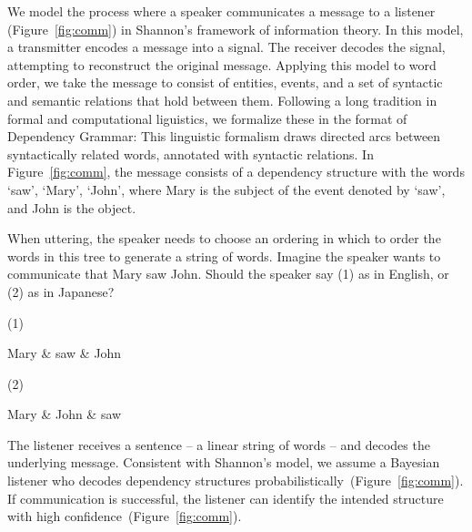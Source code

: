 \documentclass[9pt,twocolumn,twoside,lineno]{pnas-new}
\begin{document}
We model the process where a speaker communicates a message to a listener (Figure~\ref{fig:comm}) in Shannon's framework of information theory.
In this model, a transmitter encodes a message into a signal. The receiver decodes the signal, attempting to reconstruct the original message.
Applying this model to word order, we take the message to consist of entities, events, and a set of syntactic and semantic relations that hold between them.
Following a long tradition in formal and computational liguistics, we formalize these in the format of Dependency Grammar:
This linguistic formalism draws directed arcs between syntactically related words, annotated with syntactic relations.
In Figure~\ref{fig:comm}, the message consists of a dependency structure with the words `saw', `Mary', `John', where Mary is the subject of the event denoted by `saw', and John is the object.


When uttering, the speaker needs to choose an ordering in which to order the words in this tree to generate a string of words.
Imagine the speaker wants to communicate that Mary saw John.
Should the speaker say (1) as in English, or (2) as in Japanese?

(1)
\begin{dependency}[theme=simple]
    \begin{deptext}
    Mary \& saw \& John \\
    \end{deptext}
\end{dependency}
(2)
\begin{dependency}[theme=simple]
    \begin{deptext}
    Mary \& John  \& saw \\
    \end{deptext}
\end{dependency}

The listener receives a sentence -- a linear string of words -- and decodes the underlying message.
Consistent with Shannon's model, we assume a Bayesian listener who decodes dependency structures probabilistically~(Figure~\ref{fig:comm}).
If communication is successful, the listener can identify the intended structure with high confidence~(Figure~\ref{fig:comm}).
\end{document}
